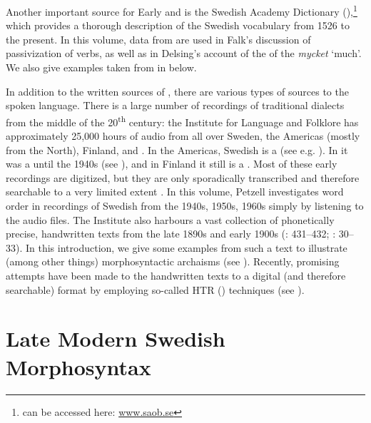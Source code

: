\documentclass[output=paper]{langscibook}
\begin{document}
Another important source for Early and  is the Swedish Academy Dictionary (),\footnote{ can be accessed here: \href{http://www.saob.se}{{www.saob.se}}} which provides a thorough description of the Swedish vocabulary from 1526 to the present. In this volume, data from  are used in Falk’s discussion of passivization of  verbs, as well as in Delsing’s account of the  of the  \textit{mycket} ‘much’. We also give examples taken from  in  below.



In addition to the written sources of , there are various types of sources to the spoken language. There is a large number of recordings of traditional dialects from the middle of the 20\textsuperscript{th} century: the Institute for Language and Folklore has approximately 25,000 hours of  audio from all over Sweden, the Americas (mostly from the North), Finland, and . In the Americas, Swedish is a  (see e.g. \citealt{Larsson2015}). In  it was a  until the 1940s (see \citealt{Rosenkvist2018}), and in Finland it still is a . Most of these early recordings are digitized, but they are only sporadically transcribed and therefore searchable to a very limited extent \citep{BergEtAl2019}. In this volume, Petzell investigates word order in recordings of  Swedish from the 1940s, 1950s, 1960s simply by listening to the audio files. The Institute also harbours a vast collection of phonetically precise, handwritten  texts from the late 1890s and early 1900s (\citealt{Sellberg1993}: 431–432; \citealt{SOU1924/27}: 30–33). In this introduction, we give some examples from such a  text to illustrate (among other things) morphosyntactic archaisms (see ). Recently, promising attempts have been made to  the handwritten texts to a digital (and therefore searchable) format by employing so-called HTR () techniques (see \citealt{Petzell2019,Petzell2020}).


\section{Late Modern Swedish Morphosyntax}\label{sec:intro:3}
\end{document}
